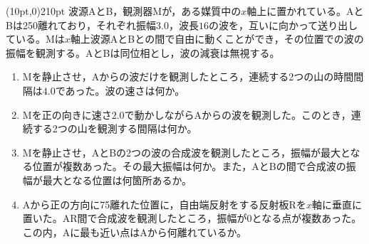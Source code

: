\hakosyokika
\item
    \begin{mawarikomi}(10pt,0){210pt}{}
        波源AとB，観測器Mが，ある媒質中の$x$軸上に置かれている。AとBは250離れており，それぞれ振幅$3.0$，波長$16$の波を，互いに向かって送り出している。Mは$x$軸上波源AとBとの間で自由に動くことができ，その位置での波の振幅を観測する。AとBは同位相とし，波の減衰は無視する。
        \begin{enumerate}
            \item Mを静止させ，Aからの波だけを観測したところ，連続する2つの山の時間間隔は$4.0$であった。波の速さは何か。
            \item Mを正の向きに速さ$2.0$で動かしながらAからの波を観測した。このとき，連続する2つの山を観測する間隔は何か。
            \item Mを静止させ，AとBの2つの波の合成波を観測したところ，振幅が最大となる位置が複数あった。その最大振幅は何か。また，AとBの間で合成波の振幅が最大となる位置は何箇所あるか。
            \item Aから正の方向に75離れた位置に，自由端反射をする反射板Rを$x$軸に垂直に置いた。AR間で合成波を観測したところ，振幅が0となる点が複数あった。この内，Aに最も近い点はAから何離れているか。
        \end{enumerate}
    \end{mawarikomi}